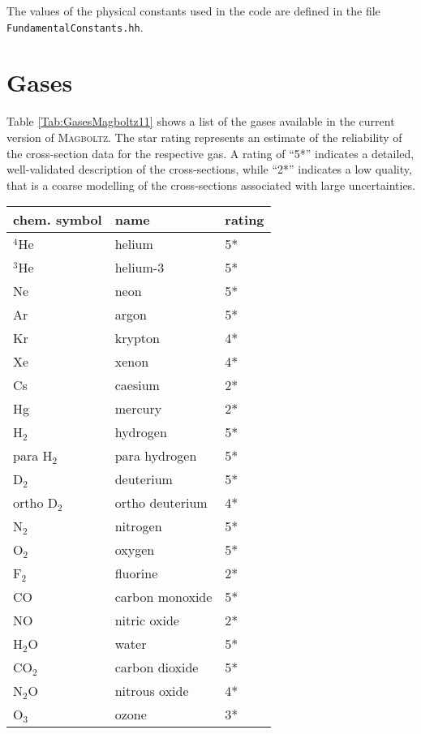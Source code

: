 \begin{appendix}
The values of the physical constants used in the code are defined  
in the file \texttt{FundamentalConstants.hh}.

\chapter{Gases}

Table \ref{Tab:GasesMagboltz11} shows a list of the gases 
available in the current version of \textsc{Magboltz}. 
The star rating represents an estimate of the reliability 
of the cross-section data for the respective gas. 
A rating of ``5*'' indicates a detailed, well-validated 
description of the cross-sections, while 
``2*'' indicates a low quality, that is 
a coarse modelling of the cross-sections 
associated with large uncertainties.

\begin{longtable}{l l l}
  \toprule
   chem. symbol & name & rating \\
  \midrule
  \(^{4}\)He & helium   & 5* \\
  \(^{3}\)He & helium-3 & 5* \\
          Ne & neon     & 5* \\
          Ar & argon    & 5* \\
          Kr & krypton  & 4* \\
          Xe & xenon    & 4* \\
  \midrule
  Cs         & caesium  & 2* \\
  Hg         & mercury  & 2* \\
  \midrule
  H\(_{2}\) & hydrogen  & 5* \\
  para H\(_{2}\) & para hydrogen  & 5* \\
  D\(_{2}\) & deuterium & 5* \\
  ortho D\(_{2}\) & ortho deuterium & 4* \\
  N\(_{2}\) & nitrogen  & 5* \\
  O\(_{2}\) & oxygen    & 5* \\
  F\(_{2}\) & fluorine  & 2* \\
  \midrule
  CO         & carbon monoxide & 5* \\
  NO         & nitric oxide    & 2* \\
  \midrule
  H\(_{2}\)O & water           & 5* \\ 
  CO\(_{2}\) & carbon dioxide  & 5* \\
  N\(_{2}\)O & nitrous oxide   & 4* \\
  O\(_{3}\)  & ozone           & 3* \\

\end{longtable}
\end{appendix}
